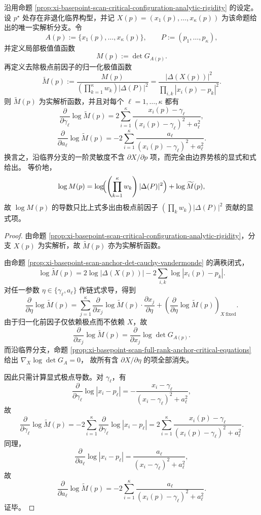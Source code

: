 \begin{theorem}\label{thm:xi-basepoint-scan-normalized-envelope-derivative-formula}
沿用命题 \ref{prop:xi-basepoint-scan-critical-configuration-analytic-rigidity} 的设定。设 \(p^\star\) 处存在非退化临界构型，并记 \(X(p)=(x_1(p),\dots,x_\kappa(p))\) 为该命题给出的唯一实解析分支。令
\[
A(p):=\{x_1(p),\dots,x_\kappa(p)\},
\qquad
P:=(p_1,\dots,p_\kappa),
\]
并定义局部极值值函数
\[
M(p):=\det G_{A(p)}.
\]
再定义去除极点前因子的归一化极值函数
\[
\widetilde M(p)
:=
\frac{M(p)}{\left(\prod_{k=1}^{\kappa}w_k\right)|\Delta(P)|^2}
=
\frac{|\Delta(X(p))|^2}{\prod_{i,k}|x_i(p)-p_k|^2}.
\]
则 \(\widetilde M(p)\) 为实解析函数，并且对每个 \(\ell=1,\dots,\kappa\) 都有
\[
\frac{\partial}{\partial \gamma_\ell}\log \widetilde M(p)
=
2\sum_{i=1}^{\kappa}
\frac{x_i(p)-\gamma_\ell}{(x_i(p)-\gamma_\ell)^2+a_\ell^2},
\]
\[
\frac{\partial}{\partial a_\ell}\log \widetilde M(p)
=
-2\sum_{i=1}^{\kappa}
\frac{a_\ell}{(x_i(p)-\gamma_\ell)^2+a_\ell^2}.
\]
换言之，沿临界分支的一阶灵敏度不含 \(\partial X/\partial p\) 项，而完全由边界势核的显式和式给出。
等价地，
\[
\log M(p)=\log\!\Bigl(\left(\prod_{k=1}^{\kappa}w_k\right)|\Delta(P)|^2\Bigr)+\log\widetilde M(p),
\]
故 \(\log M(p)\) 的导数只比上式多出由极点前因子 \(\left(\prod_k w_k\right)|\Delta(P)|^2\) 贡献的显式项。
\end{theorem}
\begin{proof}
由命题 \ref{prop:xi-basepoint-scan-critical-configuration-analytic-rigidity}，分支 \(X(p)\) 为实解析，故 \(\widetilde M(p)\) 亦为实解析函数。

由命题 \ref{prop:xi-basepoint-scan-anchor-det-cauchy-vandermonde} 的满秩闭式，
\[
\log \widetilde M(p)
=
2\log|\Delta(X(p))|
-2\sum_{i,k}\log|x_i(p)-p_k|.
\]
对任一参数 \(\eta\in\{\gamma_\ell,a_\ell\}\) 作链式求导，得到
\[
\frac{\partial}{\partial \eta}\log \widetilde M(p)
=
\sum_{j=1}^{\kappa}
\frac{\partial}{\partial x_j}\log \widetilde M(p)\cdot \frac{\partial x_j}{\partial \eta}
+\left(\frac{\partial}{\partial \eta}\log \widetilde M(p)\right)_{\!X\ \mathrm{fixed}}.
\]
由于归一化前因子仅依赖极点而不依赖 \(X\)，故
\[
\frac{\partial}{\partial x_j}\log \widetilde M(p)
=
\frac{\partial}{\partial x_j}\log \det G_{A(p)}.
\]
而沿临界分支，命题 \ref{prop:xi-basepoint-scan-full-rank-anchor-critical-equations} 给出
\(
\nabla_X \log \det G_A=0
\)，
故所有含 \(\partial X/\partial \eta\) 的项全部消失。

因此只需计算显式极点导数。对 \(\gamma_\ell\)，有
\[
\frac{\partial}{\partial \gamma_\ell}\log|x_i-p_\ell|
=-\frac{x_i-\gamma_\ell}{(x_i-\gamma_\ell)^2+a_\ell^2},
\]
故
\[
\frac{\partial}{\partial \gamma_\ell}\log \widetilde M(p)
=
-2\sum_{i=1}^{\kappa}\frac{\partial}{\partial \gamma_\ell}\log|x_i-p_\ell|
=
2\sum_{i=1}^{\kappa}
\frac{x_i(p)-\gamma_\ell}{(x_i(p)-\gamma_\ell)^2+a_\ell^2}.
\]
同理，
\[
\frac{\partial}{\partial a_\ell}\log|x_i-p_\ell|
=\frac{a_\ell}{(x_i-\gamma_\ell)^2+a_\ell^2},
\]
故
\[
\frac{\partial}{\partial a_\ell}\log \widetilde M(p)
=
-2\sum_{i=1}^{\kappa}
\frac{a_\ell}{(x_i(p)-\gamma_\ell)^2+a_\ell^2}.
\]
证毕。
\end{proof}

